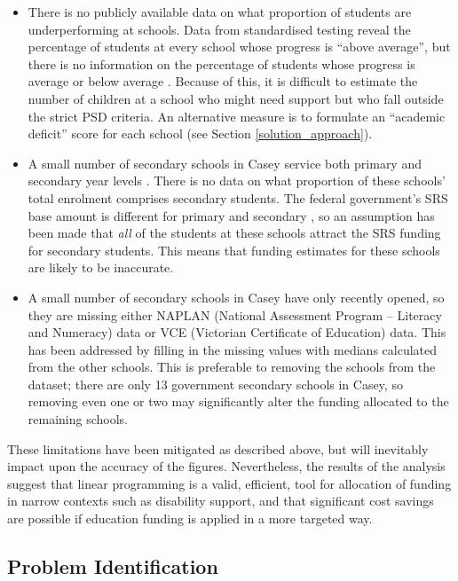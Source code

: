 \documentclass[11pt, a4paper]{article}
\begin{document}
    \begin{itemize}
        \item There is no publicly available data on what proportion of students are underperforming at schools. Data from standardised testing reveal the percentage of students at every school whose progress is ``above average'', but there is no information on the percentage of students whose progress is average or below average \parencite{naplan}. Because of this, it is difficult to estimate the number of children at a school who might need support but who fall outside the strict PSD criteria. An alternative measure is to formulate an ``academic deficit'' score for each school (see Section \ref{solution_approach}).
        \item A small number of secondary schools in Casey service both primary and secondary year levels \parencite{casey_schools}. There is no data on what proportion of these schools' total enrolment comprises secondary students. The federal government's SRS base amount is different for primary and secondary \parencite{srs_2020}, so an assumption has been made that \textit{all} of the students at these schools attract the SRS funding for secondary students. This means that funding estimates for these schools are likely to be inaccurate.
        \item A small number of secondary schools in Casey have only recently opened, so they are missing either NAPLAN (National Assessment Program – Literacy and Numeracy) data or VCE (Victorian Certificate of Education) data. This has been addressed by filling in the missing values with medians calculated from the other schools. This is preferable to removing the schools from the dataset; there are only 13 government secondary schools in Casey, so removing even one or two may significantly alter the funding allocated to the remaining schools.
    \end{itemize}

    These limitations have been mitigated as described above, but will inevitably impact upon the accuracy of the figures. Nevertheless, the results of the analysis suggest that linear programming is a valid, efficient, tool for allocation of funding in narrow contexts such as disability support, and that significant cost savings are possible if education funding is applied in a more targeted way.  

    \subsection{Problem Identification} \label{problem_id}
\end{document}
